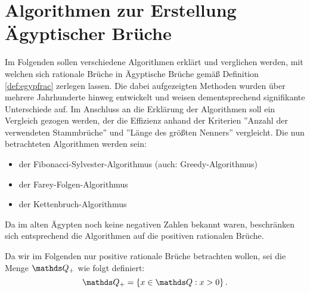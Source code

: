 \section{Algorithmen zur Erstellung Ägyptischer Brüche}\label{sec:algorithmen}
Im Folgenden sollen verschiedene Algorithmen erklärt und verglichen werden, mit welchen sich rationale Brüche in Ägyptische Brüche gemäß Definition \ref{def:egypfrac} zerlegen lassen. Die dabei aufgezeigten Methoden wurden über mehrere Jahrhunderte hinweg entwickelt und weisen dementsprechend signifikante Unterschiede auf. Im Anschluss an die Erklärung der Algorithmen soll ein Vergleich gezogen werden, der die Effizienz anhand der Kriterien ''Anzahl der verwendeten Stammbrüche'' und ''Länge des größten Nenners'' vergleicht.
Die nun betrachteten Algorithmen werden sein:
\begin{itemize}
	\item der Fibonacci-Sylvester-Algorithmus (auch: Greedy-Algorithmus)
	\item der Farey-Folgen-Algorithmus
	\item der Kettenbruch-Algorithmus
\end{itemize}

Da im alten Ägypten noch keine negativen Zahlen bekannt waren, beschränken sich entsprechend die Algorithmen auf die positiven rationalen Brüche.
\begin{def1}
	Da wir im Folgenden nur positive rationale Brüche betrachten wollen, sei die Menge $\Q_+$ wie folgt definiert:
	$$\Q_+ = \left\{x \in \Q: x>0\right\}.$$
\end{def1}